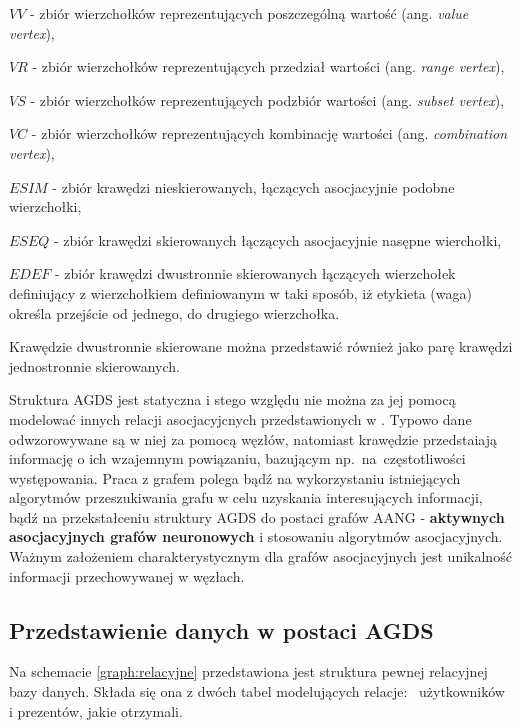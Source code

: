 \begin{description}
    \item \(VV\) - zbiór wierzchołków reprezentujących poszczególną wartość (ang. \emph{value vertex}),
    \item \(VR\) - zbiór wierzchołków reprezentujących przedział wartości (ang. \emph{range vertex}),
    \item \(VS\) - zbiór wierzchołków reprezentujących podzbiór wartości (ang. \emph{subset vertex}),
    \item \(VC\) - zbiór wierzchołków reprezentujących kombinację wartości (ang. \emph{combination vertex}),
    \item \(ESIM\) - zbiór krawędzi nieskierowanych, łączących asocjacyjnie podobne wierzchołki,
    \item \(ESEQ\) - zbiór krawędzi skierowanych łączących asocjacyjnie nasępne wierchołki,
    \item \(EDEF\) - zbiór krawędzi dwustronnie skierowanych łączących wierzchołek definiujący z wierzchołkiem definiowanym w taki sposób,
                     iż etykieta (waga) określa przejście od jednego, do drugiego wierzchołka.
\end{description}

Krawędzie dwustronnie skierowane można przedstawić również jako parę krawędzi jednostronnie skierowanych.

Struktura AGDS jest statyczna i stego względu nie można za jej pomocą modelować innych relacji asocjacyjcnych przedstawionych w \cite{Horzyk}.
Typowo dane odwzorowywane są w niej za pomocą węzłów, natomiast krawędzie przedstaiają informację o ich wzajemnym powiązaniu, bazującym np.~na~częstotliwości
występowania. Praca z grafem polega bądź na wykorzystaniu istniejących algorytmów przeszukiwania grafu w celu uzyskania interesujących informacji, bądź
na przekstałceniu struktury AGDS do postaci grafów AANG - \textbf{aktywnych asocjacyjnych grafów neuronowych} i stosowaniu algorytmów asocjacyjnych.
Ważnym założeniem charakterystycznym dla grafów asocjacyjnych jest unikalność informacji przechowywanej w węzłach. 

\subsection{Przedstawienie danych w postaci AGDS}
Na schemacie \ref{graph:relacyjne} przedstawiona jest struktura pewnej relacyjnej bazy danych. Składa się ona z dwóch tabel modelujących relacje:~
użytkowników i prezentów, jakie otrzymali. 

